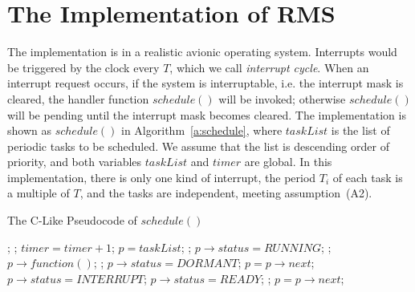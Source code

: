 \documentclass{llncs}
\begin{document}
\section{The Implementation of RMS}
\label{s:imp}
The implementation is in a realistic avionic operating system.
Interrupts would be triggered by the clock every $T$, which we call
\emph{interrupt cycle}. When an interrupt request occurs, if the
system is interruptable, i.e. the interrupt mask is cleared, the
handler function $schedule()$ will be invoked; otherwise $schedule()$
will be pending until the interrupt mask becomes cleared.  The
implementation is shown as $schedule()$ in Algorithm~\ref{a:schedule},
where $taskList$ is the list of periodic tasks to be scheduled. We
assume that the list is descending order of priority, and both
variables $taskList$ and $timer$ are global. In this implementation,
there is only one kind of interrupt, the period $T_i$ of each task is
a multiple of $T$, and the tasks are independent, meeting
assumption~(A2).

\begin{algorithm}
  \caption{The C-Like Pseudocode of $schedule()$}
  \label{a:schedule}
  \begin{algorithmic}[1]
  \State {};  \label{l:1stline}
  \State {}; \label{l:updatestatus}
  \State $timer = timer + 1$; \label{l:timer} \label{l:inc}
  \State $p = taskList$;
   \label{l:startrun1st}
      \State \Return;
      \State $p\rightarrow status = \textit{RUNNING}$;
      \State {};  \label{l:endrun1st}
      \State $p\rightarrow function()$;  \label{l:function}
      \State {};
      \State $p\rightarrow status = \textit{DORMANT}$;
    \EndIf
    \State $p = p\rightarrow next$;
  \EndWhile
\EndFunction
{}
     \label{l:startupdate}
      \State $p\rightarrow status = \textit{INTERRUPT}$;
    \EndIf
     
        
        \State $p\rightarrow status = \textit{READY}$;
      \Else {}
	\State {}; 
      \EndIf
    \EndIf \label{l:endupdate}
    \State $p = p\rightarrow next$;
  \EndWhile
\EndFunction
  \end{algorithmic}
\end{algorithm}
\end{document}
